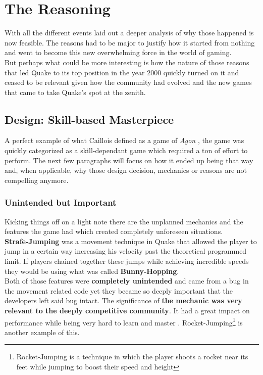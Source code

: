 \section{The Reasoning}
\label{sec::reasoning}

With all the different events laid out a deeper analysis of why those happened is now feasible. The reasons had to be major to justify how it started from nothing and went to become this new overwhelming force in the world of gaming.\\

But perhaps what could be more interesting is how the nature of those reasons that led Quake to its top position in the year 2000 quickly turned on it and ceased to be relevant given how the community had evolved and the new games that came to take Quake's spot at the zenith.\\

\subsection{Design: Skill-based Masterpiece}

A perfect example of what Caillois defined as a game of \textit{Agon} \citep{caillois1961man}, the game was quickly categorized as a skill-dependant game which required a ton of effort to perform. The next few paragraphs will focus on how it ended up being that way and, when applicable, why those design decision, mechanics or reasons are not compelling anymore.

\subsubsection{Unintended but Important}

Kicking things off on a light note there are the unplanned mechanics and the features the game had which created completely unforeseen situations.\\

\textbf{Strafe-Jumping} was a movement technique in Quake that allowed the player to jump in a certain way increasing his velocity past the theoretical programmed limit. If players chained together these jumps while achieving incredible speeds they would be using what was called \textbf{Bunny-Hopping}.\\

Both of those features were \textbf{completely unintended} and came from a bug in the movement related code yet they became so deeply important that the developers left said bug intact. The significance of \textbf{the mechanic was very relevant to the deeply competitive community}. It had a great impact on performance while being very hard to learn and master \parencite{speedRun}. Rocket-Jumping\footnote{Rocket-Jumping is a technique in which the player shoots a rocket near its feet while jumping to boost their speed and height} is another example of this.\\

